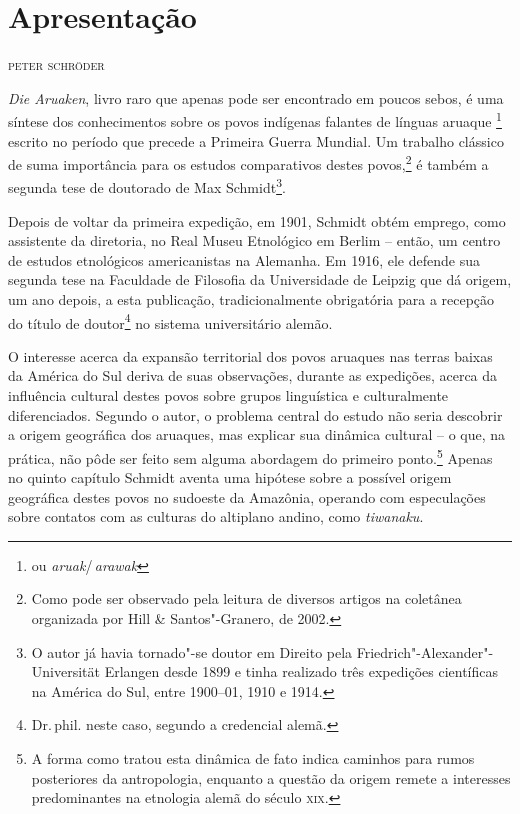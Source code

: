 \newcommand{\subtitulo}[1]{\NoCaseChange{\textnormal{\break\Large\itshape#1}}}
\chapter*{Apresentação\smallskip\subtitulo{Um clássico da etnologia\\ sul-americanista}}


\begin{flushright}
\textsc{peter schröder}\medskip
\end{flushright}

\noindent{}\textit{Die Aruaken}, livro raro que apenas pode ser encontrado em poucos
sebos, é uma síntese dos conhecimentos sobre os povos indígenas falantes
de línguas aruaque \footnote{ou \textit{aruak}/\,\textit{arawak}} escrito no período que precede a Primeira Guerra Mundial. Um trabalho clássico de suma importância para os
estudos comparativos destes povos,\footnote{Como pode ser observado pela
leitura de diversos artigos na coletânea organizada por Hill \&
Santos"-Granero, de 2002.} é também a segunda tese de doutorado de Max Schmidt\footnote{O autor já havia tornado"-se doutor em Direito pela Friedrich"-Alexander"-Universität Erlangen desde 1899 e tinha realizado três expedições científicas na América do Sul, entre 1900--01, 1910 e 1914.}. 

Depois de voltar da primeira expedição, em 1901, Schmidt obtém emprego, como assistente da diretoria, no Real Museu Etnológico em Berlim -- então, um centro de estudos etnológicos americanistas na Alemanha. Em 1916, ele defende sua segunda tese na Faculdade de Filosofia da Universidade de Leipzig que dá origem, um ano depois, a esta publicação, tradicionalmente obrigatória para 
a recepção do título de doutor\footnote{Dr.\,phil. neste caso, segundo a credencial alemã.} no sistema universitário alemão.

O interesse acerca da expansão territorial dos povos aruaques nas terras baixas da América do Sul
deriva de suas observações, durante as expedições, acerca da influência cultural
destes povos sobre grupos linguística e culturalmente
diferenciados. Segundo o autor, o problema central do estudo
não seria descobrir a origem geográfica dos aruaques, mas explicar sua
dinâmica cultural -- o que, na prática, não pôde ser feito sem alguma abordagem
do primeiro ponto.\footnote{A forma como tratou esta dinâmica de fato
indica caminhos para rumos posteriores da antropologia, enquanto
a questão da origem remete a interesses predominantes na etnologia alemã do século
\textsc{xix}.} Apenas no quinto capítulo Schmidt aventa uma hipótese sobre a possível origem geográfica destes povos no sudoeste da Amazônia, operando com
especulações sobre contatos com as culturas do altiplano andino, como
\textit{tiwanaku}.

